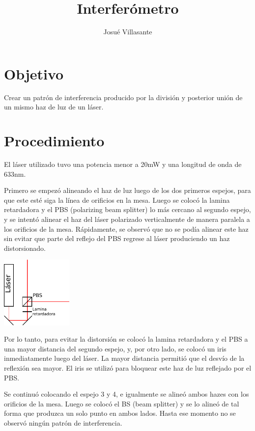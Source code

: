 \documentclass[twocolumn]{article}
\author{Josué Villasante}
\title{Interferómetro}
\begin{document}
	\maketitle

	\section{Objetivo}
		Crear un patrón de interferencia producido por la división y posterior unión de un mismo haz de luz de un láser.

	\section{Procedimiento}
		El láser utilizado tuvo una potencia menor a 20mW y una longitud de onda de 633nm.

		Primero se empezó alineando el haz de luz luego de los dos primeros espejos, para que este esté siga la línea de orificios en la mesa. Luego se colocó la lamina retardadora y el PBS (polarizing beam splitter) lo más cercano al segundo espejo, y se intentó alinear el haz del láser polarizado verticalmente de manera paralela a los orificios de la mesa. Rápidamente, se observó que no se podía alinear este haz sin evitar que parte del reflejo del PBS regrese al láser produciendo un haz distorsionado.

		\begin{center}
			\includegraphics[width=100pt]{img/layout_attempt.pdf}
		\end{center}

		Por lo tanto, para evitar la distorsión se colocó la lamina retardadora y el PBS a una mayor distancia del segundo espejo, y, por otro lado, se colocó un iris inmediatamente luego del láser. La mayor distancia permitió que el desvío de la reflexión sea mayor. El iris se utilizó para bloquear este haz de luz reflejado por el PBS.

		Se continuó colocando el espejo 3 y 4, e igualmente se alineó ambos hazes con los orificios de la mesa. Luego se colocó el BS (beam splitter) y se lo alineó de tal forma que produzca un solo punto en ambos lados. Hasta ese momento no se observó ningún patrón de interferencia.
\end{document}
